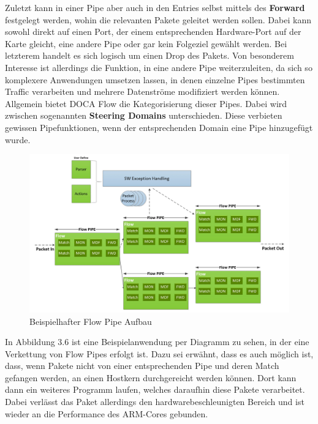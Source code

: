 Zuletzt kann in einer Pipe aber auch in den Entries selbst mittels des \textbf{Forward} festgelegt werden, wohin die relevanten Pakete geleitet werden sollen. Dabei kann sowohl direkt auf einen Port, der einem entsprechenden Hardware-Port auf der Karte gleicht, eine andere Pipe oder gar kein Folgeziel gewählt werden. Bei letzterem handelt es sich logisch um einen Drop des Pakets. Von besonderem Interesse ist allerdings die Funktion, in eine andere Pipe weiterzuleiten, da sich so komplexere Anwendungen umsetzen lassen, in denen einzelne Pipes bestimmten Traffic verarbeiten und mehrere Datenströme modifiziert werden können. Allgemein bietet DOCA Flow die Kategorisierung dieser Pipes. Dabei wird zwischen sogenannten \textbf{Steering Domains} unterschieden. Diese verbieten gewissen Pipefunktionen, wenn der entsprechenden Domain eine Pipe hinzugefügt wurde. 
\begin{figure}
    \centering
    \includegraphics[width=1\linewidth]{images/Screenshot 2025-04-30 at 11-16-05 DOCA Flow - NVIDIA Docs.png}
    \caption{Beispielhafter Flow Pipe Aufbau}
    \label{fig:enter-label}
\end{figure}

In Abbildung 3.6 ist eine Beispielanwendung per Diagramm zu sehen, in der eine Verkettung von Flow Pipes erfolgt ist. Dazu sei erwähnt, dass es auch möglich ist, dass, wenn Pakete nicht von einer entsprechenden Pipe und deren Match gefangen werden, an einen Hostkern durchgereicht werden können. Dort kann dann ein weiteres Programm laufen, welches daraufhin diese Pakete verarbeitet. Dabei verlässt das Paket allerdings den hardwarebeschleunigten Bereich und ist wieder an die Performance des ARM-Cores gebunden.

